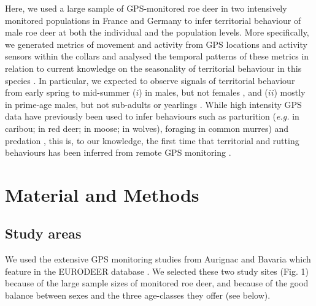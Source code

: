 \documentclass[a4paper,11pt]{article}
\begin{document}
Here, we used a large sample of GPS-monitored roe deer in two
intensively monitored populations in France and Germany to infer
territorial behaviour of male roe deer at both the individual and the
population levels. More specifically, we generated metrics of movement
and activity from GPS locations and activity sensors within the
collars and analysed the temporal patterns of these metrics in
relation to current knowledge on the seasonality of territorial
behaviour in this species \citep{andersen_social_1998}. In particular,
we expected to observe signals of territorial behaviour from early
spring to mid-summer ($i$) in males, but not females
\citep{andersen_mating_1998}, and ($ii$) mostly in prime-age males,
but not sub-adults or yearlings \citep{vanpe_age-specific_2009}. While
high intensity GPS data have previously been used to infer behaviours
such as parturition (\textit{e.g.} \cite{demars_inferring_2013} in
caribou; \cite{asher_use_2014} in red deer; \cite{severud_using_2015}
in moose; \cite{walsh_estimating_2016} in wolves), foraging
\cite{evans_foraging_2013} in common murres) and predation \citep[][
in bears]{krofel_use_2013,cristescu_predicting_2015}, this is, to our
knowledge, the first time that territorial and rutting behaviours has
been inferred from remote GPS monitoring \citep[but see][on lekking in
little bustards]{silva_spatial_2017}.

\section*{Material and Methods}
\subsection*{Study areas}

We used the extensive GPS monitoring studies from Aurignac and Bavaria
which feature in the EURODEER database
\citep{cagnacci_partial_2011}. We selected these two study sites
(Fig. 1) because of the large sample sizes of monitored roe deer, and
because of the good balance between sexes and the three age-classes
they offer (see below).
\end{document}
